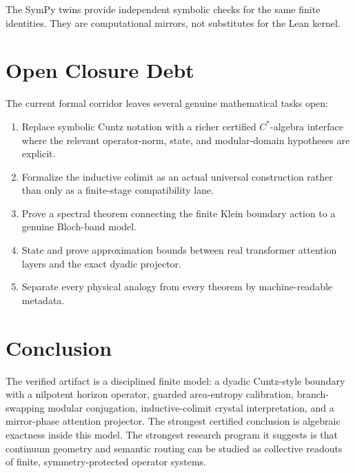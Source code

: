 \documentclass[11pt,a4paper]{article}
\begin{document}
The SymPy twins provide independent symbolic checks for the same finite identities. They are computational mirrors, not substitutes for the Lean kernel.

\section{Open Closure Debt}

The current formal corridor leaves several genuine mathematical tasks open:
\begin{enumerate}
  \item Replace symbolic Cuntz notation with a richer certified $C^*$-algebra interface where the relevant operator-norm, state, and modular-domain hypotheses are explicit.
  \item Formalize the inductive colimit as an actual universal construction rather than only as a finite-stage compatibility lane.
  \item Prove a spectral theorem connecting the finite Klein boundary action to a genuine Bloch-band model.
  \item State and prove approximation bounds between real transformer attention layers and the exact dyadic projector.
  \item Separate every physical analogy from every theorem by machine-readable metadata.
\end{enumerate}

\section{Conclusion}

The verified artifact is a disciplined finite model: a dyadic Cuntz-style boundary with a nilpotent horizon operator, guarded area-entropy calibration, branch-swapping modular conjugation, inductive-colimit crystal interpretation, and a mirror-phase attention projector. The strongest certified conclusion is algebraic exactness inside this model. The strongest research program it suggests is that continuum geometry and semantic routing can be studied as collective readouts of finite, symmetry-protected operator systems.
\end{document}
